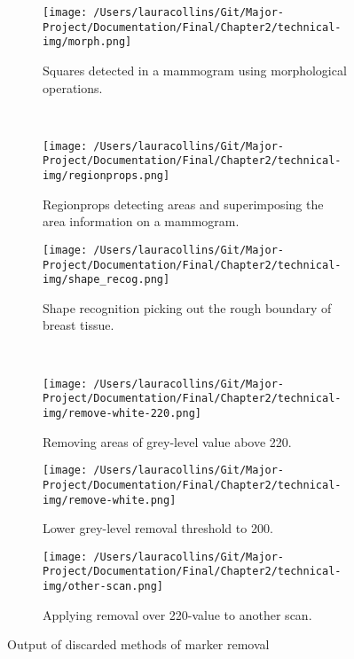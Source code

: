 \begin{figure}[H]
    \centering
    \begin{subfigure}[t]{0.3\textwidth}
        \texttt{[image: /Users/lauracollins/Git/Major-Project/Documentation/Final/Chapter2/technical-img/morph.png]}
        \caption{Squares detected in a mammogram using morphological operations.}
        \label{fig:morph}
    \end{subfigure} \hfill
    ~ %
    \begin{subfigure}[t]{0.3\textwidth}
        \texttt{[image: /Users/lauracollins/Git/Major-Project/Documentation/Final/Chapter2/technical-img/regionprops.png]}
        \caption{Regionprops detecting areas and superimposing the area information on a mammogram.}
        \label{fig:regionprops}
    \end{subfigure} \hfill
    \begin{subfigure}[t]{0.3\textwidth}
      \texttt{[image: /Users/lauracollins/Git/Major-Project/Documentation/Final/Chapter2/technical-img/shape\_recog.png]}
      \caption{Shape recognition picking out the rough boundary of breast tissue.}
      \label{fig:shape-recog}
    \end{subfigure}
    ~ %

    \begin{subfigure}[t]{0.3\textwidth}
      \texttt{[image: /Users/lauracollins/Git/Major-Project/Documentation/Final/Chapter2/technical-img/remove-white-220.png]}
      \caption{Removing areas of grey-level value above 220.}
      \label{fig:remove-white}
    \end{subfigure} \hfill
    \begin{subfigure}[t]{0.3\textwidth}
      \texttt{[image: /Users/lauracollins/Git/Major-Project/Documentation/Final/Chapter2/technical-img/remove-white.png]}
      \caption{Lower grey-level removal threshold to 200.}
      \label{fig:remove-white-200}
    \end{subfigure} \hfill
    \begin{subfigure}[t]{0.3\textwidth}
      \texttt{[image: /Users/lauracollins/Git/Major-Project/Documentation/Final/Chapter2/technical-img/other-scan.png]}
      \caption{Applying removal over 220-value to another scan.}
      \label{fig:remove-other-scan}
    \end{subfigure}
    \caption{Output of discarded methods of marker removal}
    \label{fig:marker-removal-discards}
\end{figure}

